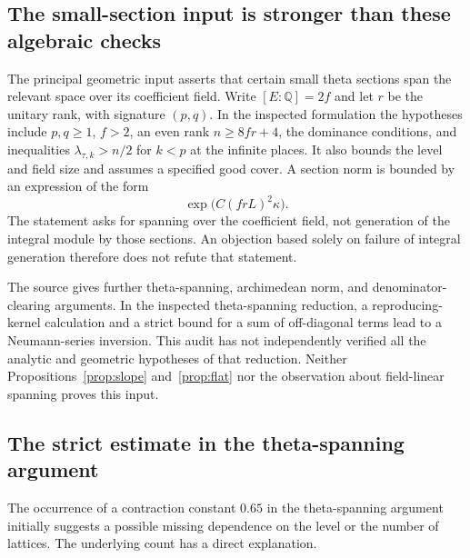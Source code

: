 \documentclass[11pt,a4paper]{article}
\theoremstyle{remark}
\newcommand{\Q}{\mathbb Q}
\newcommand{\src}[1]{\cite{#1}}
\begin{document}
\subsection{The small-section input is stronger than these algebraic checks}
The principal geometric input asserts that certain small theta sections span the relevant space over its coefficient field. Write $[E:\Q]=2f$ and let $r$ be the unitary rank, with signature $(p,q)$. In the inspected formulation the hypotheses include $p,q\ge1$, $f>2$, an even rank $n\ge8fr+4$, the dominance conditions, and inequalities $\lambda_{\tau,k}>n/2$ for $k<p$ at the infinite places. It also bounds the level and field size and assumes a specified good cover. A section norm is bounded by an expression of the form
\[
 \exp\bigl(C(frL)^2\kappa\bigr).
\]
The statement asks for spanning over the coefficient field, not generation of the integral module by those sections. An objection based solely on failure of integral generation therefore does not refute that statement. \src{S-gmin}

The source gives further theta-spanning, archimedean norm, and denominator-clearing arguments. In the inspected theta-spanning reduction, a reproducing-kernel calculation and a strict bound for a sum of off-diagonal terms lead to a Neumann-series inversion. This audit has not independently verified all the analytic and geometric hypotheses of that reduction. Neither Propositions~\ref{prop:slope} and~\ref{prop:flat} nor the observation about field-linear spanning proves this input.

\subsection{The strict estimate in the theta-spanning argument}
The occurrence of a contraction constant $0.65$ in the theta-spanning argument initially suggests a possible missing dependence on the level or the number of lattices. The underlying count has a direct explanation.
\end{document}
